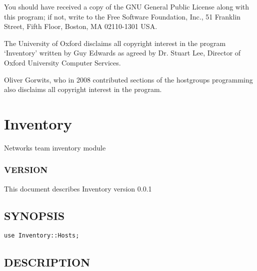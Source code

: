 \documentclass{book}
\begin{document}
You should have received a copy of the GNU General Public License along with this program; if not, write to the Free Software Foundation, Inc., 51 Franklin Street, Fifth Floor, Boston, MA 02110-1301 USA.



The University of Oxford disclaims all copyright interest in the program `Inventory' written by Guy Edwards as agreed by Dr. Stuart Lee, Director of Oxford University Computer Services.



Oliver Gorwits, who in 2008 contributed sections of the hostgroups programming also disclaims all copyright interest in the program.




\section{Inventory}
\label{_Inventory::Hosts}
\hypertarget{_Inventory::Hosts}{}



Networks team inventory module


\subsubsection{VERSION}
\label{Inventory::Hosts_VERSION}
\hypertarget{Inventory::Hosts_VERSION}{}



This document describes Inventory version 0.0.1


\subsection{SYNOPSIS}
\label{Inventory::Hosts_SYNOPSIS}
\hypertarget{Inventory::Hosts_SYNOPSIS}{}


\begin{Verbatim}[fontfamily=courier,gobble=1,frame=lines,fontsize=\small]
  use Inventory::Hosts;
\end{Verbatim}


\subsection{DESCRIPTION}
\label{Inventory::Hosts_DESCRIPTION}
\hypertarget{Inventory::Hosts_DESCRIPTION}{}
\end{document}

